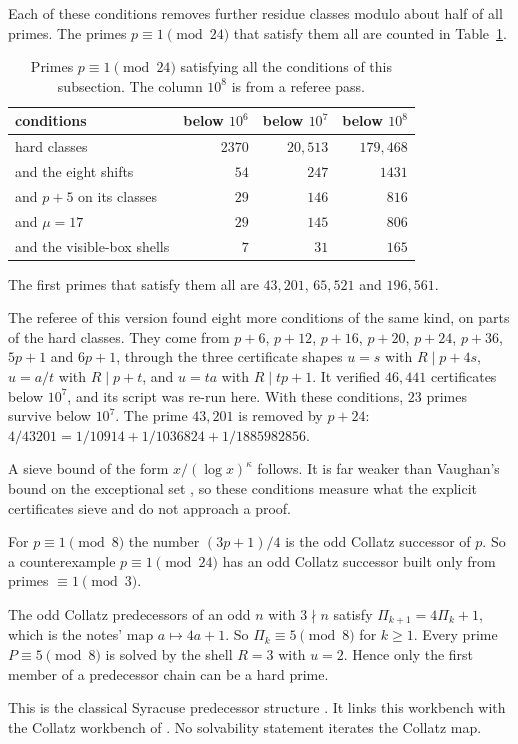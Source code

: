 Each of these conditions removes further residue classes modulo about half of all primes. The primes $p\equiv1\pmod{24}$ that satisfy them all are counted in Table~\ref{tab:survivors}.

\begin{center}\small
\begin{longtable}{@{}lrrr@{}}
\caption{Primes $p\equiv1\pmod{24}$ satisfying all the conditions of this subsection. The column $10^8$ is from a referee pass.}\label{tab:survivors}\\
\toprule
conditions & below $10^6$ & below $10^7$ & below $10^8$\\
\midrule
hard classes & $2370$ & $20{,}513$ & $179{,}468$\\
and the eight shifts & $54$ & $247$ & $1431$\\
and $p+5$ on its classes & $29$ & $146$ & $816$\\
and $\mu=17$ & $29$ & $145$ & $806$\\
and the visible-box shells & $7$ & $31$ & $165$\\
\bottomrule
\end{longtable}
\end{center}

The first primes that satisfy them all are $43{,}201$, $65{,}521$ and $196{,}561$.

The referee of this version found eight more conditions of the same kind, on parts of the hard classes. They come from $p+6$, $p+12$, $p+16$, $p+20$, $p+24$, $p+36$, $5p+1$ and $6p+1$, through the three certificate shapes $u=s$ with $R\mid p+4s$, $u=a/t$ with $R\mid p+t$, and $u=ta$ with $R\mid tp+1$. It verified $46{,}441$ certificates below $10^7$, and its script was re-run here. With these conditions, $23$ primes survive below $10^7$. The prime $43{,}201$ is removed by $p+24$: $4/43201=1/10914+1/1036824+1/1885982856$.

A sieve bound of the form $x/(\log x)^\kappa$ follows. It is far weaker than Vaughan's bound on the exceptional set \cite{Vaughan}, so these conditions measure what the explicit certificates sieve and do not approach a proof.

\begin{remark}\label{rem:collatz}
For $p\equiv1\pmod8$ the number $(3p+1)/4$ is the odd Collatz successor of $p$. So a counterexample $p\equiv1\pmod{24}$ has an odd Collatz successor built only from primes $\equiv1\pmod3$.

The odd Collatz predecessors of an odd $n$ with $3\nmid n$ satisfy $\Pi_{k+1}=4\Pi_k+1$, which is the notes' map $a\mapsto4a+1$. So $\Pi_k\equiv5\pmod8$ for $k\ge1$. Every prime $P\equiv5\pmod8$ is solved by the shell $R=3$ with $u=2$. Hence only the first member of a predecessor chain can be a hard prime.

This is the classical Syracuse predecessor structure \cite{Lagarias}. It links this workbench with the Collatz workbench of \cite{WorkbenchReader}. No solvability statement iterates the Collatz map.
\end{remark}

